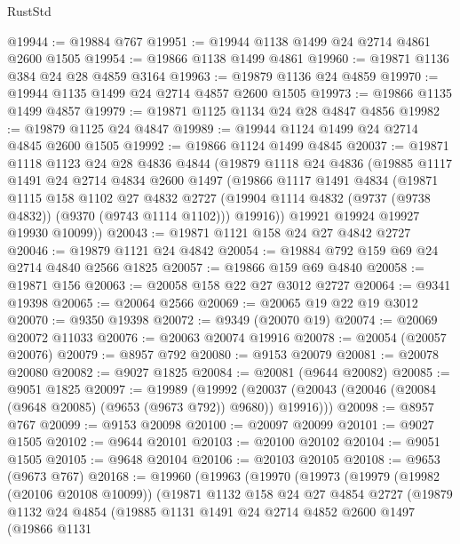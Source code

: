 \begin{lexlean}{RustStd}
\begin{coremodule}
{\begin{coremodule}
{{{{{{{{{{{{{{{{{{{{{{{{{{{{{{{{{{{{{{{@19944 := @19884 @767
@19951 := @19944 @1138 @1499 @24 @2714 @4861 @2600 @1505
@19954 := @19866 @1138 @1499 @4861
@19960 := @19871 @1136 @384 @24 @28 @4859 @3164
@19963 := @19879 @1136 @24 @4859
@19970 := @19944 @1135 @1499 @24 @2714 @4857 @2600 @1505
@19973 := @19866 @1135 @1499 @4857
@19979 := @19871 @1125 @1134 @24 @28 @4847 @4856
@19982 := @19879 @1125 @24 @4847
@19989 := @19944 @1124 @1499 @24 @2714 @4845 @2600 @1505
@19992 := @19866 @1124 @1499 @4845
@20037 := @19871
    @1118
    @1123
    @24
    @28
    @4836
    @4844
    (@19879
      @1118
      @24
      @4836
      (@19885
        @1117
        @1491
        @24
        @2714
        @4834
        @2600
        @1497
        (@19866
          @1117
          @1491
          @4834
          (@19871
            @1115
            @158
            @1102
            @27
            @4832
            @2727
            (@19904 @1114 @4832 (@9737 (@9738 @4832)) (@9370 (@9743 @1114 @1102)))
            @19916))
        @19921
        @19924
        @19927
        @19930
        @10099))
@20043 := @19871 @1121 @158 @24 @27 @4842 @2727
@20046 := @19879 @1121 @24 @4842
@20054 := @19884 @792 @159 @69 @24 @2714 @4840 @2566 @1825
@20057 := @19866 @159 @69 @4840
@20058 := @19871 @156
@20063 := @20058 @158 @22 @27 @3012 @2727
@20064 := @9341 @19398
@20065 := @20064 @2566
@20069 := @20065 @19 @22 @19 @3012
@20070 := @9350 @19398
@20072 := @9349 (@20070 @19)
@20074 := @20069 @20072 @11033
@20076 := @20063 @20074 @19916
@20078 := @20054 (@20057 @20076)
@20079 := @8957 @792
@20080 := @9153 @20079
@20081 := @20078 @20080
@20082 := @9027 @1825
@20084 := @20081 (@9644 @20082)
@20085 := @9051 @1825
@20097 := @19989
    (@19992 (@20037 (@20043 (@20046 (@20084 (@9648 @20085) (@9653 (@9673 @792)) @9680)) @19916)))
@20098 := @8957 @767
@20099 := @9153 @20098
@20100 := @20097 @20099
@20101 := @9027 @1505
@20102 := @9644 @20101
@20103 := @20100 @20102
@20104 := @9051 @1505
@20105 := @9648 @20104
@20106 := @20103 @20105
@20108 := @9653 (@9673 @767)
@20168 := @19960
    (@19963
      (@19970
        (@19973
          (@19979
            (@19982 (@20106 @20108 @10099))
            (@19871
              @1132
              @158
              @24
              @27
              @4854
              @2727
              (@19879
                @1132
                @24
                @4854
                (@19885
                  @1131
                  @1491
                  @24
                  @2714
                  @4852
                  @2600
                  @1497
                  (@19866
                    @1131
}}}}}}}}}}}}}}}}}}}}}}}}}}}}}}}}}}}}}}}
\end{coremodule}}
\end{coremodule}
\end{lexlean}
